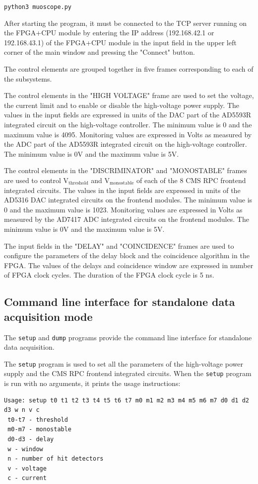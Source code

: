 \documentclass[12pt, a4paper]{article}
\begin{document}
\texttt{python3 muoscope.py}

After starting the program, it must be connected to the TCP server running on the FPGA+CPU module by entering the IP address (192.168.42.1 or 192.168.43.1) of the FPGA+CPU module in the input field in the upper left corner of the main window and pressing the "Connect" button.

The control elements are grouped together in five frames corresponding to each of the subsystems.

The control elements in the "HIGH VOLTAGE" frame are used to set the voltage, the current limit and to enable or disable the high-voltage power supply. The values in the input fields are expressed in units of the DAC part of the AD5593R integrated circuit on the high-voltage controller. The minimum value is 0 and the maximum value is 4095. Monitoring values are expressed in Volts as measured by the ADC part of the AD5593R integrated circuit on the high-voltage controller. The minimum value is 0V and the maximum value is 5V.

The control elements in the "DISCRIMINATOR" and "MONOSTABLE" frames are used to control $\text{V}_\text{threshold}$ and $\text{V}_\text{monostable}$ of each of the 8 CMS RPC frontend integrated circuits. The values in the input fields are expressed in units of the AD5316 DAC integrated circuits on the frontend modules. The minimum value is 0 and the maximum value is 1023. Monitoring values are expressed in Volts as measured by the AD7417 ADC integrated circuits on the frontend modules. The minimum value is 0V and the maximum value is 5V.

The input fields in the "DELAY" and "COINCIDENCE" frames are used to configure the parameters of the delay block and the coincidence algorithm in the FPGA. The values of the delays and coincidence window are expressed in number of FPGA clock cycles. The duration of the FPGA clock cycle is 5 ns.

\subsection{Command line interface for standalone data acquisition mode}

The \texttt{setup} and \texttt{dump} programs provide the command line interface for standalone data acquisition.

The \texttt{setup} program is used to set all the parameters of the high-voltage power supply and the CMS RPC frontend integrated circuits. When the \texttt{setup} program is run with no arguments, it prints the usage instructions:
\vspace{-1ex}
\begin{verbatim}
Usage: setup t0 t1 t2 t3 t4 t5 t6 t7 m0 m1 m2 m3 m4 m5 m6 m7 d0 d1 d2 d3 w n v c
 t0-t7 - threshold
 m0-m7 - monostable
 d0-d3 - delay
 w - window
 n - number of hit detectors
 v - voltage
 c - current
\end{verbatim}
\end{document}
